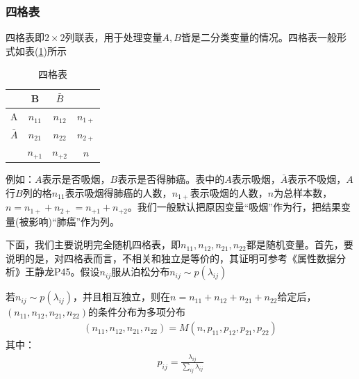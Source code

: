         \subsubsection{四格表}
            \par
            四格表即$2\times 2$列联表，用于处理变量$A,B$皆是二分类变量的情况。四格表一般形式如表(\ref{tab:四格表})所示
            \begin{table}[H]
            \caption{四格表}
            \label{tab:四格表}
            \centering
            \begin{tabular}{c|cc|c}
            {}& B& $\bar{B}$ & {}\\
            \hline
            A& $n_{11}$& $n_{12}$ & $n_{1+}$\\
            $\bar{A}$& $n_{21}$& $n_{22}$ & $n_{2+}$\\
            \hline
            {}& $n_{+1}$& $n_{+2}$ & $n$\\
            \end{tabular}
            \end{table}
            例如：$A$表示是否吸烟，$B$表示是否得肺癌。表中的$A$表示吸烟，$\bar{A}$表示不吸烟，$A$行$B$列的格$n_{11}$表示吸烟得肺癌的人数，$n_{1+}$表示吸烟的人数，$n$为总样本数，$n = n_{1+}+n_{2+}= n_{+1}+n_{+2}$。我们一般默认把原因变量“吸烟”作为行，把结果变量(被影响)“肺癌”作为列。
            \par
            下面，我们主要说明完全随机四格表，即$n_{11},n_{12},n_{21},n_{22}$都是随机变量。首先，要说明的是，对四格表而言，不相关和独立是等价的，其证明可参考《属性数据分析》王静龙P45。假设$n_{ij}$服从泊松分布$n_{ij}\sim p(\lambda_{ij})$
            \begin{theorem}
            若$n_{ij}\sim p(\lambda_{ij})$，并且相互独立，则在$n = n_{11}+n_{12}+n_{21}+n_{22}$给定后，$(n_{11},n_{12},n_{21},n_{22})$的条件分布为多项分布
            \begin{align*}
            (n_{11},n_{12},n_{21},n_{22}) = M(n,p_{11},p_{12},p_{21},p_{22})
            \end{align*}
            其中：
            \begin{align*}
            p_{ij} = \frac{\lambda_{ij}}{\sum_{ij}\lambda_{ij}}
            \end{align*}
            \end{theorem}
